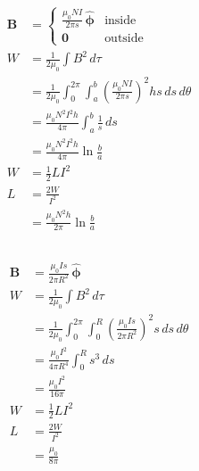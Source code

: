 \documentclass{article}
\renewcommand{\vec}[1]{\boldsymbol{\mathbf{#1}}}
\newcommand{\uvec}[1]{\hat{\vec{#1}}}
\begin{document}
\begin{align*}
  \vec{B} & = \begin{cases}
                \frac{\mu_0 N I}{2 \pi s} \,\uvec{\phi} & \text{inside}  \\
                \vec{0}                                 & \text{outside}
              \end{cases}                                                  \\
  W       & = \frac{1}{2 \mu_0} \int B^2 \,d \tau                                                                       \\
          & = \frac{1}{2 \mu_0} \int_0^{2 \pi} \int_a^b \left( \frac{\mu_0 N I}{2 \pi s} \right)^2 h s \,d s \,d \theta \\
          & = \frac{\mu_0 N^2 I^2 h}{4 \pi} \int_a^b \frac{1}{s} \,d s                                                  \\
          & = \frac{\mu_0 N^2 I^2 h}{4 \pi} \ln \frac{b}{a}                                                             \\
  W       & = \frac{1}{2} L I^2                                                                                         \\
  L       & = \frac{2 W}{I^2}                                                                                           \\
          & = \frac{\mu_0 N^2 h}{2 \pi} \ln \frac{b}{a}
\end{align*}

\subsection{}

\begin{align*}
  \vec{B} & = \frac{\mu_0 I s}{2 \pi R^2} \,\uvec{\phi}                                                                 \\
  W       & = \frac{1}{2 \mu_0} \int B^2 \,d \tau                                                                       \\
          & = \frac{1}{2 \mu_0} \int_0^{2 \pi} \int_0^R \left( \frac{\mu_0 I s}{2 \pi R^2} \right)^2 s \,d s \,d \theta \\
          & = \frac{\mu_0 I^2}{4 \pi R^4} \int_0^R s^3 \,d s                                                            \\
          & = \frac{\mu_0 I^2}{16 \pi}                                                                                  \\
  W       & = \frac{1}{2} L I^2                                                                                         \\
  L       & = \frac{2 W}{I^2}                                                                                           \\
          & = \frac{\mu_0}{8 \pi}
\end{align*}
\end{document}
